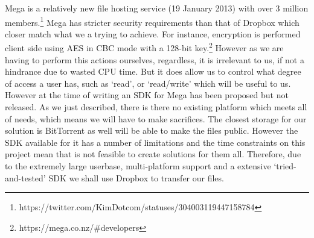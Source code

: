 \documentclass[12pt, titlepage]{article}
\begin{document}
\newline \indent Mega is a relatively new file hosting service (19 January 2013) with over 3 million members.\footnote{https://twitter.com/KimDotcom/statuses/304003119447158784} Mega  has stricter security requirements than that of Dropbox which closer match what we a trying to achieve. For instance, encryption is performed client side using AES in CBC mode with a 128-bit key.\footnote{https://mega.co.nz/\#developers} However as we are having to perform this actions ourselves, regardless, it is irrelevant to us, if not a hindrance due to wasted CPU time. But it does allow us to control what degree of access a user has, such as `read', or `read/write' which will be useful to us. However at the time of writing an SDK for Mega has been proposed but not released.
\newline \indent As we just described, there is there no existing platform which meets all of needs, which means we will have to make sacrifices. The closest storage for our solution is BitTorrent as well will be able to make the files public. However the SDK available for it has a number of limitations and the time constraints on this project mean that is not feasible to create solutions for them all. Therefore, due to the extremely large userbase, multi-platform support and a extensive `tried-and-tested' SDK we shall use Dropbox to transfer our files.
\end{document}
